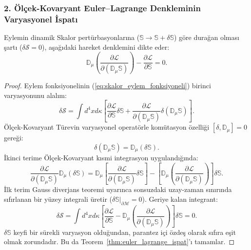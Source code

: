 \subsubsection{2. Ölçek-Kovaryant Euler--Lagrange Denkleminin Varyasyonel İspatı}
\begin{theorem}
    \label{thm:euler_lagrange_ispat}
    Eylemin dinamik Skalor pertürbasyonlarına ($\mathbb{S} \to \mathbb{S} + \delta \mathbb{S}$) göre durağan olması şartı ($\delta \mathcal{S} = 0$), aşağıdaki hareket denklemini dikte eder:
    \begin{equation}
        \mathbb{D}_\mu \left( \frac{\partial \mathcal{L}}{\partial (\mathbb{D}_\mu \mathbb{S})} \right) - \frac{\partial \mathcal{L}}{\partial \mathbb{S}} = 0.
        \label{eq:euler_lagrange_tam_denklem}
    \end{equation}
\end{theorem}

\begin{proof}
    Eylem fonksiyonelinin (\ref{eq:skalor_eylem_fonksiyoneli}) birinci varyasyonunu alalım:
    \begin{equation}
        \delta \mathcal{S} = \int d^4x d\kappa \left[ \frac{\partial \mathcal{L}}{\partial \mathbb{S}} \delta \mathbb{S} + \frac{\partial \mathcal{L}}{\partial (\mathbb{D}_\mu \mathbb{S})} \delta (\mathbb{D}_\mu \mathbb{S}) \right].
    \end{equation}
    Ölçek-Kovaryant Türevin varyasyonel operatörle komütasyon özelliği $[\delta, \mathbb{D}_\mu] = 0$ gereği:
    \begin{equation}
        \delta(\mathbb{D}_\mu \mathbb{S}) = \mathbb{D}_\mu (\delta \mathbb{S}).
    \end{equation}
    İkinci terime Ölçek-Kovaryant kısmi integrasyon uygulandığında:
    \begin{equation}
        \frac{\partial \mathcal{L}}{\partial (\mathbb{D}_\mu \mathbb{S})} \mathbb{D}_\mu (\delta \mathbb{S}) = \mathbb{D}_\mu \left[ \frac{\partial \mathcal{L}}{\partial (\mathbb{D}_\mu \mathbb{S})} \delta \mathbb{S} \right] - \left[ \mathbb{D}_\mu \left( \frac{\partial \mathcal{L}}{\partial (\mathbb{D}_\mu \mathbb{S})} \right) \right] \delta \mathbb{S}.
    \end{equation}
    İlk terim Gauss diverjans teoremi uyarınca sonsuzdaki uzay-zaman sınırında sıfırlanan bir yüzey integrali üretir ($\delta \mathbb{S}\big|_{\partial \mathcal{M}} = 0$). Geriye kalan integrant:
    \begin{equation}
        \delta \mathcal{S} = \int d^4x d\kappa \left[ \frac{\partial \mathcal{L}}{\partial \mathbb{S}} - \mathbb{D}_\mu \left( \frac{\partial \mathcal{L}}{\partial (\mathbb{D}_\mu \mathbb{S})} \right) \right] \delta \mathbb{S} = 0.
    \end{equation}
    $\delta \mathbb{S}$ keyfi bir sürekli varyasyon olduğundan, parantez içi özdeş olarak sıfıra eşit olmak zorundadır. Bu da Teorem~\ref{thm:euler_lagrange_ispat}'ı tamamlar.
\end{proof}

